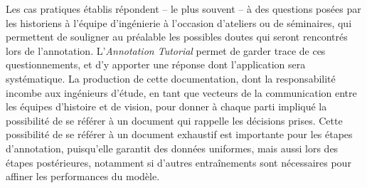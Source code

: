 	Les cas pratiques établis répondent -- le plus souvent -- à des questions posées par les historiens à l'équipe d'ingénierie à l'occasion d'ateliers ou de séminaires, qui permettent de souligner au préalable les possibles doutes qui seront rencontrés lors de l'annotation. L'\textit{Annotation Tutorial} permet de garder trace de ces questionnements, et d'y apporter une réponse dont l'application sera systématique. La production de cette documentation, dont la responsabilité incombe aux ingénieurs d'étude, en tant que vecteurs de la communication entre les équipes d'histoire et de vision, pour donner à chaque parti impliqué la possibilité de se référer à un document qui rappelle les décisions prises. Cette possibilité de se référer à un document exhaustif est importante pour les étapes d'annotation, puisqu'elle garantit des données uniformes, mais aussi lors des étapes postérieures, notamment si d'autres entraînements sont nécessaires pour affiner les performances du modèle.
